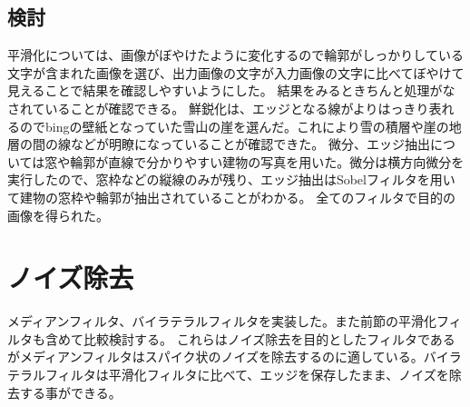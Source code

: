 \documentclass[11pt,a4j]{jsarticle}
\begin{document}
    \subsection{検討}
    平滑化については、画像がぼやけたように変化するので輪郭がしっかりしている文字が含まれた画像を選び、出力画像の文字が入力画像の文字に比べてぼやけて見えることで結果を確認しやすいようにした。
    結果をみるときちんと処理がなされていることが確認できる。
    鮮鋭化は、エッジとなる線がよりはっきり表れるのでbingの壁紙となっていた雪山の崖を選んだ。これにより雪の積層や崖の地層の間の線などが明瞭になっていることが確認できた。
    微分、エッジ抽出については窓や輪郭が直線で分かりやすい建物の写真を用いた。微分は横方向微分を実行したので、窓枠などの縦線のみが残り、エッジ抽出はSobelフィルタを用いて建物の窓枠や輪郭が抽出されていることがわかる。
    全てのフィルタで目的の画像を得られた。
    \section{ノイズ除去}
    メディアンフィルタ、バイラテラルフィルタを実装した。また前節の平滑化フィルタも含めて比較検討する。
    これらはノイズ除去を目的としたフィルタであるがメディアンフィルタはスパイク状のノイズを除去するのに適している。バイラテラルフィルタは平滑化フィルタに比べて、エッジを保存したまま、ノイズを除去する事ができる。
\end{document}
